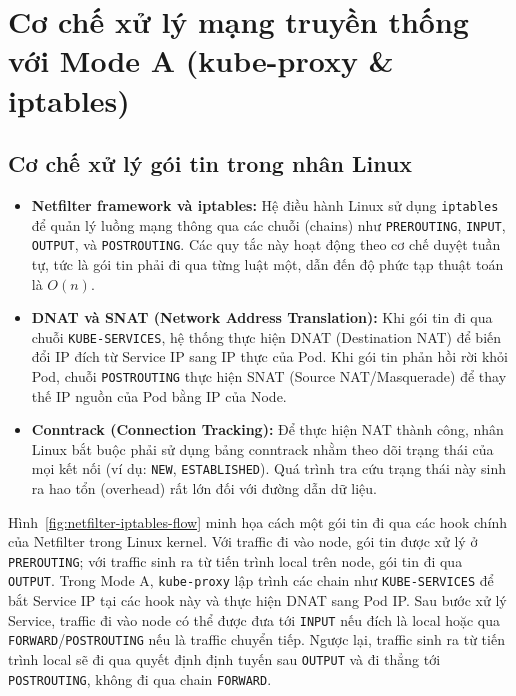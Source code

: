 \section{Cơ chế xử lý mạng truyền thống với Mode A (kube-proxy \& iptables)}

\subsection{Cơ chế xử lý gói tin trong nhân Linux}
\begin{itemize}
    \item \textbf{Netfilter framework và iptables:} Hệ điều hành Linux sử dụng \texttt{iptables} để quản lý luồng mạng thông qua các chuỗi (chains) như \texttt{PREROUTING}, \texttt{INPUT}, \texttt{OUTPUT}, và \texttt{POSTROUTING}. Các quy tắc này hoạt động theo cơ chế duyệt tuần tự, tức là gói tin phải đi qua từng luật một, dẫn đến độ phức tạp thuật toán là $O(n)$.
    \item \textbf{DNAT và SNAT (Network Address Translation):} Khi gói tin đi qua chuỗi \texttt{KUBE-SERVICES}, hệ 
	thống thực hiện DNAT (Destination NAT) để biến đổi IP đích từ Service IP sang IP thực của Pod. Khi gói tin phản 
	hồi rời khỏi Pod, chuỗi \texttt{POSTROUTING} thực hiện SNAT (Source NAT/Masquerade) để thay thế IP nguồn của Pod bằng IP của Node.
    \item \textbf{Conntrack (Connection Tracking):} Để thực hiện NAT thành công, nhân Linux bắt buộc phải sử dụng bảng conntrack nhằm theo dõi trạng thái của mọi kết nối (ví dụ: \texttt{NEW}, \texttt{ESTABLISHED}). Quá trình tra cứu trạng thái này sinh ra hao tổn (overhead) rất lớn đối với đường dẫn dữ liệu.
\end{itemize}

Hình~\ref{fig:netfilter-iptables-flow} minh họa cách một gói tin đi qua các hook chính của Netfilter trong Linux kernel. Với traffic đi vào node, gói tin được xử lý ở \texttt{PREROUTING}; với traffic sinh ra từ tiến trình local trên node, gói tin đi qua \texttt{OUTPUT}. Trong Mode A, \texttt{kube-proxy} lập trình các chain như \texttt{KUBE-SERVICES} để bắt Service IP tại các hook này và thực hiện DNAT sang Pod IP. Sau bước xử lý Service, traffic đi vào node có thể được đưa tới \texttt{INPUT} nếu đích là local hoặc qua \texttt{FORWARD}/\texttt{POSTROUTING} nếu là traffic chuyển tiếp. Ngược lại, traffic sinh ra từ tiến trình local sẽ đi qua quyết định định tuyến sau \texttt{OUTPUT} và đi thẳng tới \texttt{POSTROUTING}, không đi qua chain \texttt{FORWARD}.

